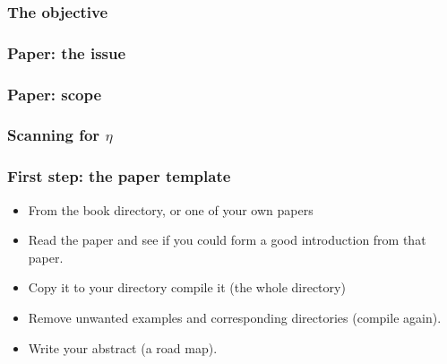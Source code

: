 \begin{frame} 

\frametitle{The objective}


\end{frame}
\cwpnote{}

\begin{frame} 

\frametitle{Paper: the issue}


\end{frame}
\cwpnote{}

\begin{frame} \frametitle{Paper: scope}


\end{frame}
\cwpnote{}

\begin{frame}  \frametitle{Scanning for $\eta$}
\end{frame} 
\cwpnote{}

\begin{frame} \frametitle{First step: the paper template}

\begin{itemize}
   \item From the book directory, or one of your own papers
   \item Read the paper and see if you could form a good introduction from that paper.
   \item Copy it to your directory compile it (the whole directory)
   \item Remove unwanted examples and corresponding directories (compile again).
   \item Write your abstract (a road map).
\end{itemize}

\end{frame}
\cwpnote{}

